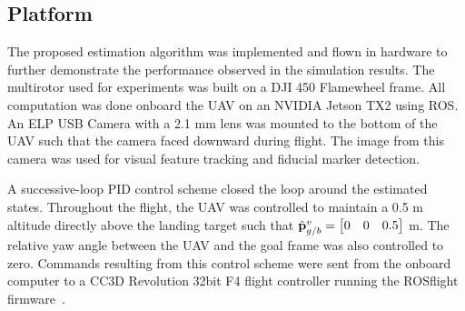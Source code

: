 
\subsection{Platform}
The proposed estimation algorithm was implemented and flown in
hardware to further demonstrate the performance observed in the simulation
results. The multirotor used for experiments was built on a DJI 450 Flamewheel
frame. All computation was done onboard the UAV on an NVIDIA Jetson TX2 using
ROS. An ELP
USB Camera with a 2.1 mm lens was mounted to the bottom of the UAV such that the
camera faced downward during flight. The image from this camera was used for visual
feature tracking and fiducial marker detection.

A successive-loop PID control scheme closed the loop around the
estimated states. Throughout the flight, the UAV was controlled to maintain a
0.5 m altitude directly above the landing target such that $\hat{\boldsymbol{\mathrm{p}}}_{g/b}^v =
\begin{bmatrix} 0 & 0 & 0.5 \end{bmatrix}$ m.
The relative yaw
angle between the UAV and the goal frame was also controlled to zero.
Commands resulting from this control scheme were sent from
the onboard computer to a CC3D Revolution 32bit F4 flight controller running
the ROSflight firmware~\cite{jackson2016rosflight}.

